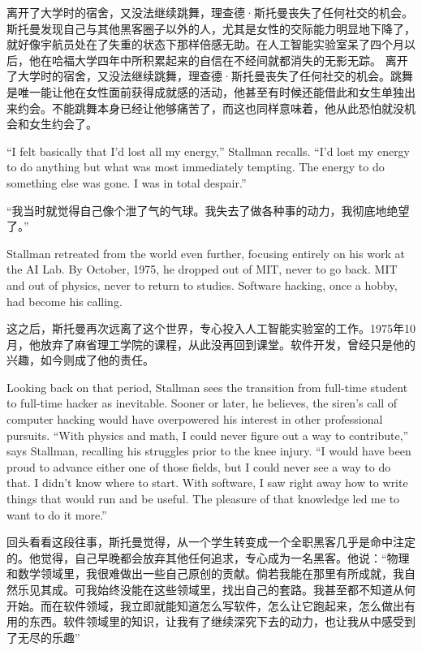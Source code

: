\ifdefined\chs
\ifdefined\vone
离开了大学时的宿舍，又没法继续跳舞，理查德·斯托曼丧失了任何社交的机会。斯托曼发现自己与其他黑客圈子以外的人，尤其是女性的交际能力明显地下降了，就好像宇航员处在了失重的状态下那样倍感无助。在人工智能实验室呆了四个月以后，他在哈福大学四年中所积累起来的自信在不经间就都消失的无影无踪。
\fi
\ifdefined\vtwo
离开了大学时的宿舍，又没法继续跳舞，理查德·斯托曼丧失了任何社交的机会。跳舞是唯一能让他在女性面前获得成就感的活动，他甚至有时候还能借此和女生单独出来约会。不能跳舞本身已经让他够痛苦了，而这也同样意味着，他从此恐怕就没机会和女生约会了。
\fi
\fi

\ifdefined\eng
``I felt basically that I'd lost all my energy,'' Stallman recalls. ``I'd lost my energy to do anything but what was most immediately tempting. The energy to do something else was gone. I was in total despair.''
\fi

\ifdefined\chs
``我当时就觉得自己像个泄了气的气球。我失去了做各种事的动力，我彻底地绝望了。''
\fi

\ifdefined\eng
Stallman retreated from the world even further, focusing entirely on his work at the AI Lab. By October, 1975, he dropped out of \ifdefined\vone MIT, never to go back. \fi\ifdefined\vtwo MIT and out of physics, never to return to studies. \fi Software hacking, once a hobby, had become his calling.
\fi

\ifdefined\chs
这之后，斯托曼再次远离了这个世界，专心投入人工智能实验室的工作。1975年10月，他放弃了麻省理工学院的课程，从此没再回到课堂。软件开发，曾经只是他的兴趣，如今则成了他的责任。
\fi

\ifdefined\eng
Looking back on that period, Stallman sees the transition from full-time student to full-time hacker as inevitable. Sooner or later, he believes, the siren's call of computer hacking would have overpowered his interest in other professional pursuits. ``With physics and math, I could never figure out a way to contribute,'' says Stallman, recalling his struggles prior to the knee injury. ``I would have been proud to advance either one of those fields, but I could never see a way to do that. I didn't know where to start. With software, I saw right away how to write things that would run and be useful. The pleasure of that knowledge led me to want to do it more.''
\fi

\ifdefined\chs
回头看看这段往事，斯托曼觉得，从一个学生转变成一个全职黑客几乎是命中注定的。他觉得，自己早晚都会放弃其他任何追求，专心成为一名黑客。他说：``物理和数学领域里，我很难做出一些自己原创的贡献。倘若我能在那里有所成就，我自然乐见其成。可我始终没能在这些领域里，找出自己的套路。我甚至都不知道从何开始。而在软件领域，我立即就能知道怎么写软件，怎么让它跑起来，怎么做出有用的东西。软件领域里的知识，让我有了继续深究下去的动力，也让我从中感受到了无尽的乐趣''
\fi

